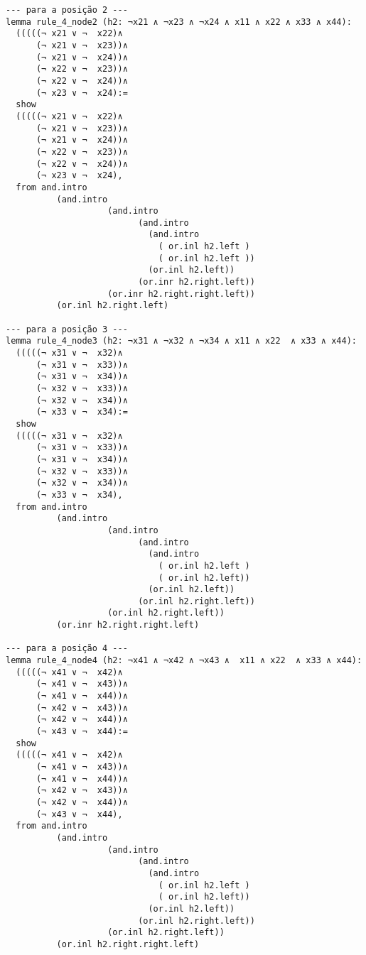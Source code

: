 \begin{lstlisting}
--- para a posição 2 ---
lemma rule_4_node2 (h2: ¬x21 ∧ ¬x23 ∧ ¬x24 ∧ x11 ∧ x22 ∧ x33 ∧ x44):
  (((((¬ x21 ∨ ¬  x22)∧
      (¬ x21 ∨ ¬  x23))∧ 
      (¬ x21 ∨ ¬  x24))∧ 
      (¬ x22 ∨ ¬  x23))∧ 
      (¬ x22 ∨ ¬  x24))∧ 
      (¬ x23 ∨ ¬  x24):=
  show
  (((((¬ x21 ∨ ¬  x22)∧
      (¬ x21 ∨ ¬  x23))∧ 
      (¬ x21 ∨ ¬  x24))∧ 
      (¬ x22 ∨ ¬  x23))∧ 
      (¬ x22 ∨ ¬  x24))∧ 
      (¬ x23 ∨ ¬  x24),
  from and.intro
          (and.intro
                    (and.intro
                          (and.intro
                            (and.intro
                              ( or.inl h2.left ) 
                              ( or.inl h2.left ))
                            (or.inl h2.left))
                          (or.inr h2.right.left))
                    (or.inr h2.right.right.left))
          (or.inl h2.right.left)

--- para a posição 3 ---
lemma rule_4_node3 (h2: ¬x31 ∧ ¬x32 ∧ ¬x34 ∧ x11 ∧ x22  ∧ x33 ∧ x44):
  (((((¬ x31 ∨ ¬  x32)∧
      (¬ x31 ∨ ¬  x33))∧ 
      (¬ x31 ∨ ¬  x34))∧ 
      (¬ x32 ∨ ¬  x33))∧ 
      (¬ x32 ∨ ¬  x34))∧ 
      (¬ x33 ∨ ¬  x34):=
  show
  (((((¬ x31 ∨ ¬  x32)∧
      (¬ x31 ∨ ¬  x33))∧ 
      (¬ x31 ∨ ¬  x34))∧ 
      (¬ x32 ∨ ¬  x33))∧ 
      (¬ x32 ∨ ¬  x34))∧ 
      (¬ x33 ∨ ¬  x34),
  from and.intro
          (and.intro
                    (and.intro
                          (and.intro
                            (and.intro
                              ( or.inl h2.left ) 
                              ( or.inl h2.left))
                            (or.inl h2.left))
                          (or.inl h2.right.left))
                    (or.inl h2.right.left))
          (or.inr h2.right.right.left)

--- para a posição 4 ---
lemma rule_4_node4 (h2: ¬x41 ∧ ¬x42 ∧ ¬x43 ∧  x11 ∧ x22  ∧ x33 ∧ x44):
  (((((¬ x41 ∨ ¬  x42)∧
      (¬ x41 ∨ ¬  x43))∧ 
      (¬ x41 ∨ ¬  x44))∧ 
      (¬ x42 ∨ ¬  x43))∧ 
      (¬ x42 ∨ ¬  x44))∧ 
      (¬ x43 ∨ ¬  x44):=
  show
  (((((¬ x41 ∨ ¬  x42)∧
      (¬ x41 ∨ ¬  x43))∧ 
      (¬ x41 ∨ ¬  x44))∧ 
      (¬ x42 ∨ ¬  x43))∧ 
      (¬ x42 ∨ ¬  x44))∧ 
      (¬ x43 ∨ ¬  x44),
  from and.intro
          (and.intro
                    (and.intro
                          (and.intro
                            (and.intro
                              ( or.inl h2.left ) 
                              ( or.inl h2.left))
                            (or.inl h2.left))
                          (or.inl h2.right.left))
                    (or.inl h2.right.left))
          (or.inl h2.right.right.left)


\end{lstlisting}
